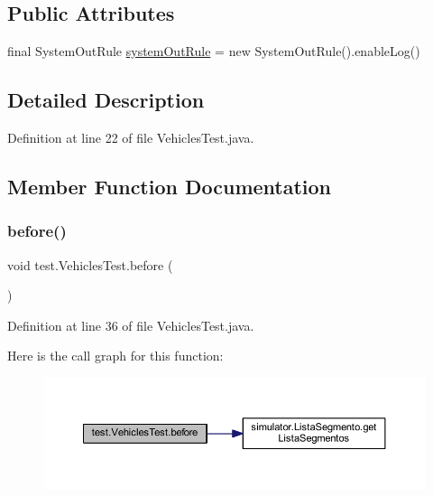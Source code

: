 \subsection*{Public Attributes}
\begin{DoxyCompactItemize}
\item 
final System\+Out\+Rule \mbox{\hyperlink{classtest_1_1_vehicles_test_aaabf0794cb228d330952cb1392a034b0}{system\+Out\+Rule}} = new System\+Out\+Rule().enable\+Log()
\end{DoxyCompactItemize}


\subsection{Detailed Description}


Definition at line 22 of file Vehicles\+Test.\+java.



\subsection{Member Function Documentation}
\mbox{\label{classtest_1_1_vehicles_test_a1fa47e6164330e08a89695175a6fed1c}} 
\subsubsection{\texorpdfstring{before()}{before()}}
{\footnotesize\ttfamily void test.\+Vehicles\+Test.\+before (\begin{DoxyParamCaption}{ }\end{DoxyParamCaption})}



Definition at line 36 of file Vehicles\+Test.\+java.

Here is the call graph for this function\+:\nopagebreak
\begin{figure}[H]
\begin{center}
\leavevmode
\includegraphics[width=350pt]{classtest_1_1_vehicles_test_a1fa47e6164330e08a89695175a6fed1c_cgraph}
\end{center}
\end{figure}
\mbox{\label{classtest_1_1_vehicles_test_a946e0396eb3a4547d8f588408bc82a6d}} 
